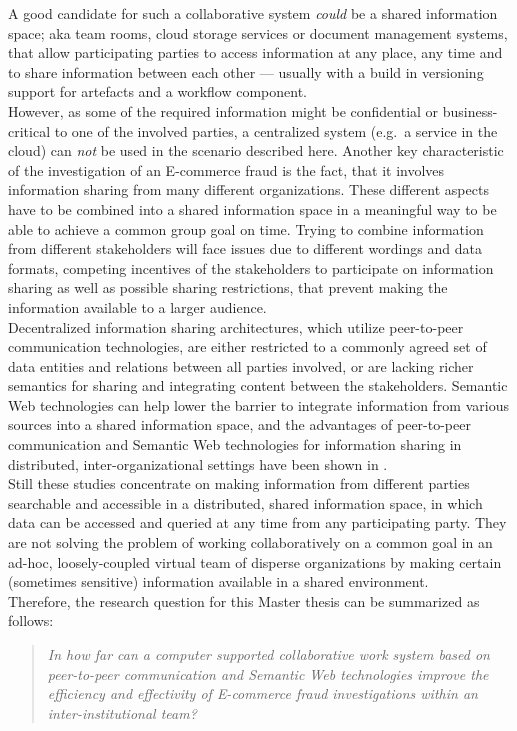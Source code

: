 A good candidate for such a collaborative system \emph{could} be a shared information space; aka team rooms, cloud storage services or document management systems, that allow participating parties to access information at any place, any time and to share information between each other --- usually with a build in versioning support for artefacts and a workflow component. \\

However, as some of the required information might be confidential or business-critical to one of the involved parties, a centralized system (e.g.\ a service in the cloud) can \emph{not} be used in the scenario described here. Another key characteristic of the investigation of an \gls{E-commerce} fraud is the fact, that it involves information sharing from many different organizations. These different aspects have to be combined into a shared information space in a meaningful way to be able to achieve a common group goal on time. Trying to combine information from different stakeholders will face issues due to different wordings and data formats, competing incentives of the stakeholders to participate on information sharing as well as possible sharing restrictions, that prevent making the information available to a larger audience. \\

Decentralized information sharing architectures, which utilize peer-to-peer communication technologies, are either restricted to a commonly agreed set of data entities and relations between all parties involved, or are lacking richer semantics for sharing and integrating content between the stakeholders. Semantic Web technologies can help lower the barrier to integrate information from various sources into a shared information space, and the advantages of peer-to-peer communication and Semantic Web technologies for information sharing in distributed, inter-organizational settings have been shown in \citep{Staab2006}. \\

Still these studies concentrate on making information from different parties searchable and accessible in a distributed, shared information space, in which data can be accessed and queried at any time from any participating party. They are not solving the problem of working collaboratively on a common goal in an ad-hoc, loosely-coupled virtual team of disperse organizations by making certain (sometimes sensitive) information available in a shared environment. \\

Therefore, the research question for this Master thesis can be summarized as follows: \@

\begin{quotation}
  \textit{In how far can a computer supported collaborative work system based on peer-to-peer communication and Semantic Web technologies improve the efficiency and effectivity of \gls{E-commerce} fraud investigations within an inter-institutional team?}
\end{quotation}


